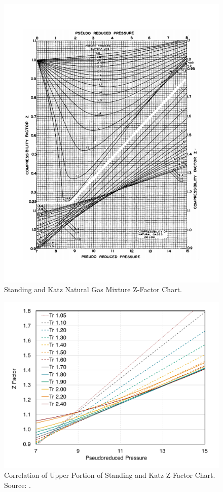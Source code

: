 \documentclass[11pt]{report}
\begin{document}
\begin{figure}[t]
\includegraphics[width=0.70\columnwidth]{images/StandingKatzOriginal.pdf}
\caption{Standing and Katz \cite{StandingKatz1942} Natural Gas Mixture Z-Factor Chart.}
\label{fig:StandingKatzZFactors}
\end{figure}

\begin{figure}[!h]
\includegraphics[width=0.70\columnwidth]{images/StandingKatzCorrelationUpper.pdf}
\caption{Correlation of Upper Portion of Standing and Katz Z-Factor Chart. Source: \cite{Standing1977}.}
\label{fig:SBBCorrelationUpper}
\end{figure}
\end{document}
